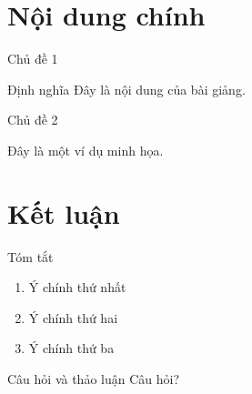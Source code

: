 \documentclass{beamer}
\begin{document}
\section{Nội dung chính}

\begin{frame}{Chủ đề 1}
    \begin{block}{Định nghĩa}
        Đây là nội dung của bài giảng.
    \end{block}
\end{frame}

\begin{frame}{Chủ đề 2}
    \begin{example}
        Đây là một ví dụ minh họa.
    \end{example}
\end{frame}

\section{Kết luận}

\begin{frame}{Tóm tắt}
    \begin{enumerate}
        \item Ý chính thứ nhất
        \item Ý chính thứ hai
        \item Ý chính thứ ba
    \end{enumerate}
\end{frame}

\begin{frame}{Câu hỏi và thảo luận}
    \centering
    \Huge Câu hỏi?
\end{frame}
\end{document}
